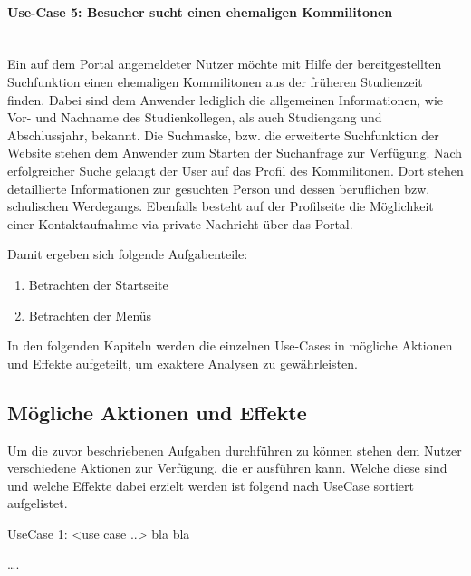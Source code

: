 \paragraph{Use-Case 5: Besucher sucht einen ehemaligen Kommilitonen}\quad \\
Ein auf dem Portal angemeldeter Nutzer möchte mit Hilfe der bereitgestellten Suchfunktion einen ehemaligen Kommilitonen aus der früheren Studienzeit finden. Dabei sind dem Anwender lediglich die allgemeinen Informationen, wie Vor- und Nachname des Studienkollegen, als auch Studiengang und Abschlussjahr, bekannt. Die Suchmaske, bzw. die erweiterte Suchfunktion der Website stehen dem Anwender zum Starten der Suchanfrage zur Verfügung. Nach erfolgreicher Suche gelangt der User auf das Profil des Kommilitonen. Dort stehen detaillierte Informationen zur gesuchten Person und dessen beruflichen bzw. schulischen Werdegangs. Ebenfalls besteht auf der Profilseite die Möglichkeit einer Kontaktaufnahme via private Nachricht über das Portal.

Damit ergeben sich folgende Aufgabenteile:
\begin{enumerate}
	\item Betrachten der Startseite
	\item Betrachten der Menüs
\end{enumerate}


In den folgenden Kapiteln werden die einzelnen Use-Cases in mögliche Aktionen und Effekte aufgeteilt, um exaktere Analysen zu gewährleisten.

\subsection{Mögliche Aktionen und Effekte}
Um die zuvor beschriebenen Aufgaben durchführen zu können stehen dem Nutzer verschiedene Aktionen zur Verfügung, die er ausführen kann. Welche diese sind und welche Effekte dabei erzielt werden ist folgend nach UseCase sortiert aufgelistet.

UseCase 1: <use case ..>
bla bla

….

